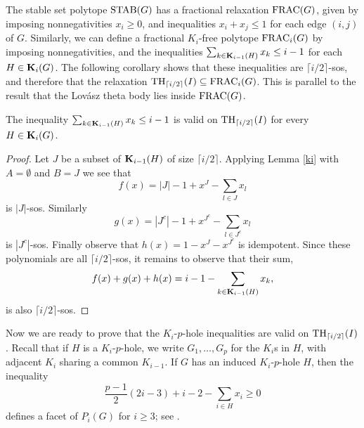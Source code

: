 The stable set polytope $\textup{STAB}(G)$ has a fractional relaxation $\textup{FRAC}(G)$, given by imposing nonnegativities $x_i \ge 0$, and inequalities $x_i + x_j \le 1$ for each edge $(i,j)$ of $G$. Similarly, we can define a fractional $K_i$-free polytope $\textup{FRAC}_i(G)$ by imposing nonnegativities, and the inequalities $\sum_{k \in \mathbf{K}_{i-1}(H)}x_k \le i-1$ for each $H \in \mathbf{K}_i(G)$. The following corollary shows that these inequalities are $\lceil i/2 \rceil$-sos, and therefore that the relaxation $\textup{TH}_{\lceil i/2 \rceil}(I) \subseteq \textup{FRAC}_i(G)$. This is parallel to the result that the Lov\'{a}sz theta body lies inside $\textup{FRAC}(G)$.

\begin{corollary} \label{frac}
The inequality $\sum_{k \in \mathbf{K}_{i-1}(H)}x_k \le i-1$ is valid on $\textup{TH}_{\lceil i/2 \rceil}(I)$ for every $H \in \mathbf{K}_i(G)$.
\end{corollary}
\begin{proof}
Let $J$ be a subset of $\mathbf{K}_{i-1}(H)$ of size $\lceil i/2 \rceil$. Applying Lemma \ref{ki} with 
$A=\emptyset$ and $B=J$ we see that 
 $$ f(x) =  |J|-1 + x^J - \sum_{l \in J} x_l $$ is $|J|$-sos. Similarly 
$$g(x)= |J^c|-1 + x^{J^c} - \sum_{l \in J^c} x_l $$ is $|J^c|$-sos. Finally observe that 
$h(x) = 1 - x^J - x^{J^c}$ is idempotent. Since these polynomials are all $\lceil i/2 \rceil$-sos, it remains to observe that their sum,
$$f(x)+g(x)+h(x)=i-1-\sum_{k \in \mathbf{K}_{i-1}(H)}x_k,$$
is also $\lceil i/2 \rceil$-sos.
\end{proof}

Now we are ready to prove that the $K_i$-$p$-hole inequalities are valid on $\textup{TH}_{\lceil i/2 \rceil}(I)$. Recall that if $H$ is a $K_i$-$p$-hole, we write $G_1,\ldots,G_p$ for the $K_i$s in $H$, with adjacent $K_i$ sharing a common $K_{i-1}$. If $G$ has an induced $K_i$-$p$-hole $H$, then the inequality
$$\frac{p-1}{2} (2i-3)+i-2 - \sum_{i \in H} x_i \geq 0$$
defines a facet of $P_i(G)$ for $i \ge 3$; see \cite{conforti}.

